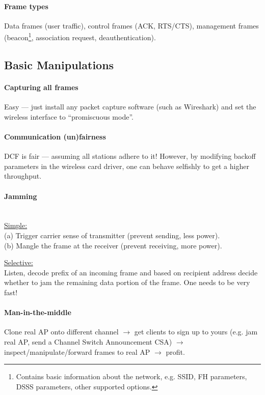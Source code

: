 \paragraph{Frame types}
Data frames (user traffic), control frames (ACK, RTS/CTS), management frames (beacon\footnote{Contains basic information about the network, e.g. SSID, FH parameters, DSSS parameters, other supported options.}, association request, deauthentication).


\subsection{Basic Manipulations}

\paragraph{Capturing all frames}
Easy --- just install any packet capture software (such as Wireshark) and set the wireless interface to ``promiscuous mode''.

\paragraph{Communication (un)fairness}
DCF is fair --- assuming all stations adhere to it!
However, by modifying backoff parameters in the wireless card driver, one can behave selfishly to get a higher throughput.

\paragraph{Jamming} \mbox{} \\
\underline{Simple:} \\
(a) Trigger carrier sense of transmitter (prevent sending, less power). \\
(b) Mangle the frame at the receiver (prevent receiving, more power).

\underline{Selective:} \\
Listen, decode prefix of an incoming frame and based on recipient address decide whether to jam the remaining data portion of the frame.
One needs to be very fast!

\paragraph{Man-in-the-middle}
Clone real AP onto different channel
$\rightarrow$ get clients to sign up to yours (e.g. jam real AP, send a Channel Switch Announcement CSA)
$\rightarrow$ inspect/manipulate/forward frames to real AP
$\rightarrow$ profit.


